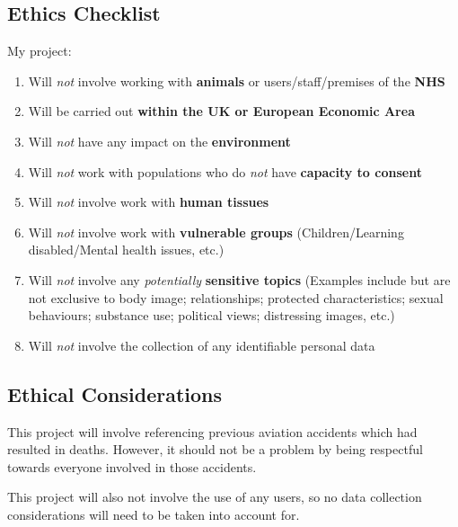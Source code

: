 \documentclass[a4paper, british]{article}
\begin{document}
\subsection{Ethics Checklist}
My project:
\begin{enumerate}
    \item Will \textit{not} involve working with \textbf{animals} or
        users/staff/premises of the \textbf{NHS}
    \item Will be carried out \textbf{within the UK or European
        Economic Area}
    \item Will \textit{not} have any impact on the \textbf{environment}
    \item Will \textit{not} work with populations who do \textit{not}
        have \textbf{capacity to consent}
    \item Will \textit{not} involve work with \textbf{human tissues}
    \item Will \textit{not} involve work with \textbf{vulnerable groups}
        (Children/Learning disabled/Mental health issues, etc.)
    \item Will \textit{not} involve any \textit{potentially}
        \textbf{sensitive topics} (Examples include but are not
        exclusive to body image; relationships; protected
        characteristics; sexual behaviours; substance use;
        political views; distressing images, etc.)
    \item Will \textit{not} involve the collection of any identifiable
        personal data
\end{enumerate}

\subsection{Ethical Considerations}
This project will involve referencing previous aviation
accidents which had resulted in deaths. However, it should not be a 
problem by being respectful towards everyone involved in those accidents.

This project will also not involve the use of any users,
so no data collection considerations will need to be taken
into account for.
\clearpage


\nocite{*}
\printbibliography[heading=bibnumbered]
\end{document}
